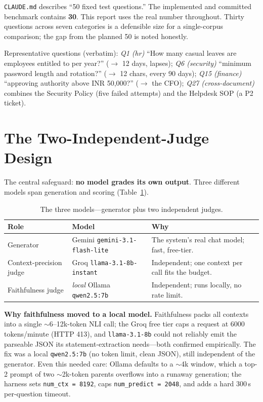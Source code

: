 \documentclass[11pt,a4paper,oneside]{report}
\newcommand{\code}[1]{\texttt{#1}}
\begin{document}
\begin{divergence}
\code{CLAUDE.md} describes ``50 fixed test questions.'' The implemented and committed benchmark contains
\textbf{30}. This report uses the real number throughout. Thirty questions across seven categories is a
defensible size for a single-corpus comparison; the gap from the planned 50 is noted honestly.
\end{divergence}

Representative questions (verbatim): \emph{Q1 (hr)} ``How many casual leaves are employees entitled to
per year?'' ($\to$ 12 days, lapses); \emph{Q6 (security)} ``minimum password length and rotation?''
($\to$ 12 chars, every 90 days); \emph{Q15 (finance)} ``approving authority above INR 50,000?'' ($\to$
the CFO); \emph{Q27 (cross-document)} combines the Security Policy (five failed attempts) and the
Helpdesk SOP (a P2 ticket).

\section{The Two-Independent-Judge Design}
\label{sec:judges}
The central safeguard: \textbf{no model grades its own output}. Three different models span generation
and scoring (Table~\ref{tab:judges}).

\begin{table}[htbp]
\centering
\caption{The three models---generator plus two independent judges.}
\label{tab:judges}
\begin{tabularx}{\linewidth}{|l|l|X|}
\hline
\rowcolor{ink}
{\color{white}\textbf{Role}} & {\color{white}\textbf{Model}} & {\color{white}\textbf{Why}}\\
\hline
Generator & Gemini \code{gemini-3.1-flash-lite} & The system's real chat model; fast, free-tier.\\ \hline
Context-precision judge & Groq \code{llama-3.1-8b-instant} & Independent; one context per call fits the budget.\\ \hline
Faithfulness judge & \emph{local} Ollama \code{qwen2.5:7b} & Independent; runs locally, no rate limit.\\ \hline
\end{tabularx}
\end{table}

\textbf{Why faithfulness moved to a local model.} Faithfulness packs all contexts into a single
$\sim$6--12k-token NLI call; the Groq free tier caps a request at 6000 tokens/minute (HTTP 413), and
\code{llama-3.1-8b} could not reliably emit the parseable JSON its statement-extraction needs---both
confirmed empirically. The fix was a local \code{qwen2.5:7b} (no token limit, clean JSON), still
independent of the generator. Even this needed care: Ollama defaults to a $\sim$4k window, which a
top-2 prompt of two $\sim$2k-token parents overflows into a runaway generation; the harness sets
\code{num\_ctx = 8192}, caps \code{num\_predict = 2048}, and adds a hard 300\,s per-question timeout.
\end{document}
